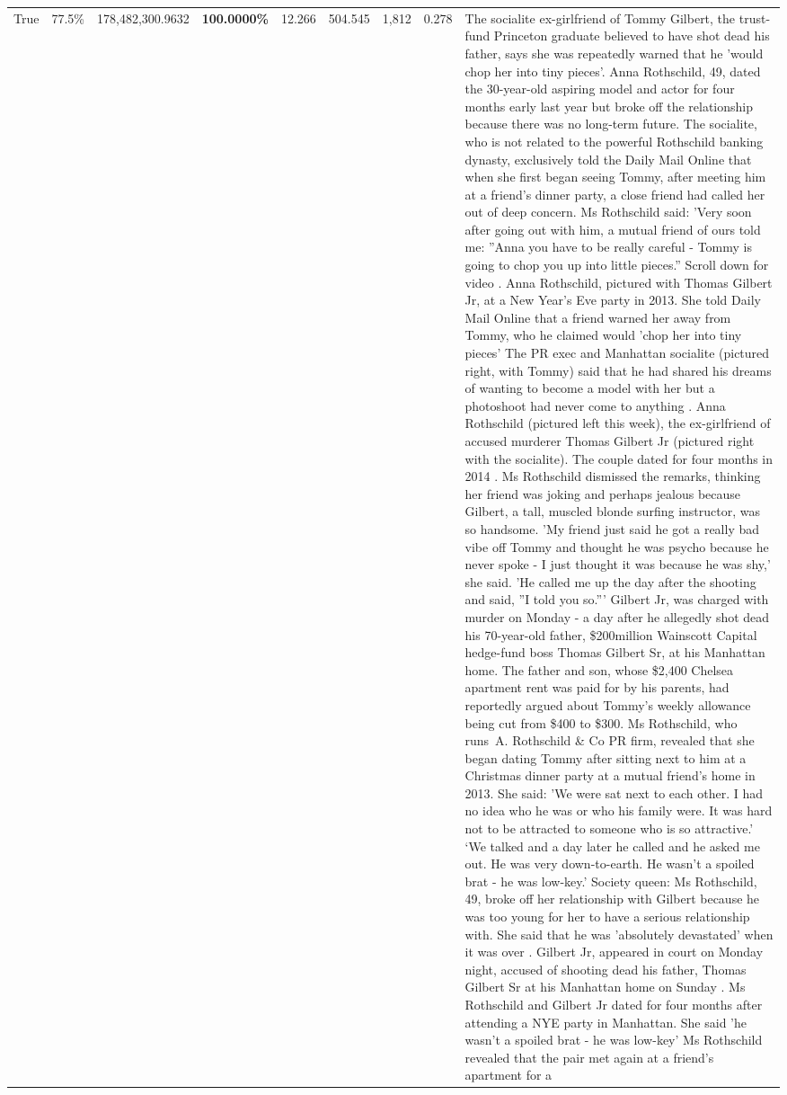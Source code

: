 \begin{table}[H]
\begin{tabular}{lllrlllll}
True & 77.5\% & 178,482,300.9632 & \bfseries \color{red} 100.0000\% & 12.266 & 504.545 & 1,812 & 0.278 & The socialite ex-girlfriend of Tommy Gilbert, the trust-fund Princeton graduate believed to have shot dead his father, says she was repeatedly warned that he 'would chop her into tiny pieces'. Anna Rothschild, 49, dated the 30-year-old aspiring model and actor for four months early last year but broke off the relationship because there was no long-term future. The socialite, who is not related to the powerful Rothschild banking dynasty, exclusively told the Daily Mail Online that when she first began seeing Tommy, after meeting him at a friend's dinner party, a close friend had called her out of deep concern. Ms Rothschild said: 'Very soon after going out with him, a mutual friend of ours told me: ''Anna you have to be really careful - Tommy is going to chop you up into little pieces.'' Scroll down for video . Anna Rothschild, pictured with Thomas Gilbert Jr, at a New Year's Eve party in 2013. She told Daily Mail Online that a friend warned her away from Tommy, who he claimed would 'chop her into tiny pieces' The PR exec and Manhattan socialite (pictured right, with Tommy) said that he had shared his dreams of wanting to become a model with her but a photoshoot had never come to anything . Anna Rothschild (pictured left this week), the ex-girlfriend of accused murderer Thomas Gilbert Jr (pictured right with the socialite). The couple dated for four months in 2014 . Ms Rothschild dismissed the remarks, thinking her friend was joking and perhaps jealous because Gilbert, a tall, muscled blonde surfing instructor, was so handsome. 'My friend just said he got a really bad vibe off Tommy and thought he was psycho because he never spoke - I just thought it was because he was shy,' she said. 'He called me up the day after the shooting and said, ''I told you so.''' Gilbert Jr, was charged with murder on Monday - a day after he allegedly shot dead his 70-year-old father, \$200million Wainscott Capital hedge-fund boss Thomas Gilbert Sr, at his Manhattan home. The father and son, whose \$2,400 Chelsea apartment rent was paid for by his parents, had reportedly argued about Tommy's weekly allowance being cut from \$400 to \$300. Ms Rothschild, who runs A. Rothschild \& Co PR firm, revealed that she began dating Tommy after sitting next to him at a Christmas dinner party at a mutual friend's home in 2013. She said: 'We were sat next to each other. I had no idea who he was or who his family were. It was hard not to be attracted to someone who is so attractive.' ‘We talked and a day later he called and he asked me out. He was very down-to-earth. He wasn’t a spoiled brat - he was low-key.’ Society queen: Ms Rothschild, 49, broke off her relationship with Gilbert because he was too young for her to have a serious relationship with. She said that he was 'absolutely devastated' when it was over . Gilbert Jr, appeared in court on Monday night, accused of shooting dead his father, Thomas Gilbert Sr at his Manhattan home on Sunday . Ms Rothschild and Gilbert Jr dated for four months after attending a NYE party in Manhattan. She said 'he wasn't a spoiled brat - he was low-key' Ms Rothschild revealed that the pair met again at a friend’s apartment for a 
\end{tabular}
\end{table}
